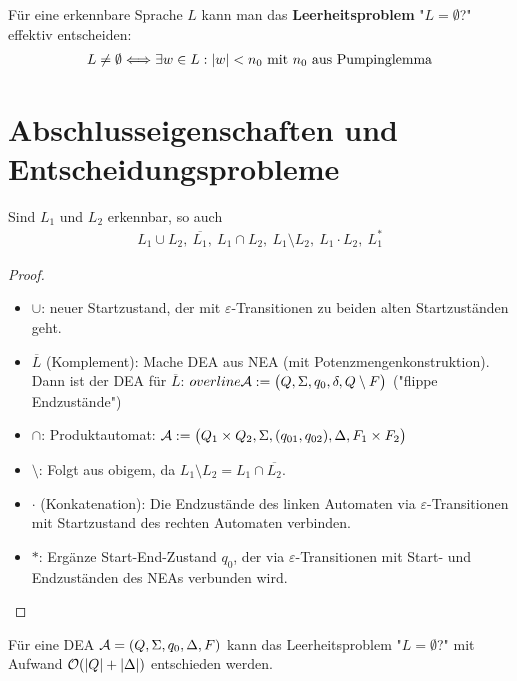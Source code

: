 \begin{satz}\label{satz3.3}
	Für eine erkennbare Sprache $L$ kann man das \textbf{Leerheitsproblem} "$L=\emptyset$?" effektiv entscheiden:
	\begin{align*}
		L\neq\emptyset\Longleftrightarrow\exists w\in L:|w|<n_0\mit n_0\text{ aus Pumpinglemma}
	\end{align*}
\end{satz}	

\section{Abschlusseigenschaften und Entscheidungsprobleme}

\begin{satz}\label{satz4.1}\enter
	Sind $L_1$ und $L_2$ erkennbar, so auch
	\begin{align*}
		L_1\cup L_2,~\overline{L_1},~L_1\cap L_2,~L_1\setminus L_2,~L_1\cdot L_2,~L_1^\ast
	\end{align*}
\end{satz}

\begin{proof}
	\begin{itemize}
		\item $\cup$: neuer Startzustand, der mit $\varepsilon$-Transitionen zu beiden alten Startzuständen geht.
		\item $\overline{L}$ (Komplement): Mache DEA aus NEA (mit Potenzmengenkonstruktion).
	Dann ist der DEA für $\overline{L}$: $\\overline{\A}:=\big(Q,\Sigma,q_0,\delta,Q\setminus F\big)$ ("flippe Endzustände")
		\item $\cap$: Produktautomat: $\A:=\big(Q_1\times Q_2,\Sigma,(q_{01},q_{02}),\Delta,F_1\times F_2\big)$
		\item $\setminus$: Folgt aus obigem, da $L_1\setminus L_2=L_1\cap\overline{L_2}$.
		\item $\cdot$ (Konkatenation): Die Endzustände des linken Automaten via $\varepsilon$-Transitionen mit Startzustand des rechten Automaten verbinden.
		\item $\ast$: Ergänze Start-End-Zustand $q_0$, der via $\varepsilon$-Transitionen mit Start- und Endzuständen des NEAs verbunden wird.
	\end{itemize}
\end{proof}

\begin{satz}\label{satz4.3}
	Für eine DEA $\A=(Q,\Sigma,q_0,\Delta,F)$ kann das Leerheitsproblem "$L=\emptyset$?" mit Aufwand $\O(|Q|+|\Delta|)$ entschieden werden.
\end{satz}

